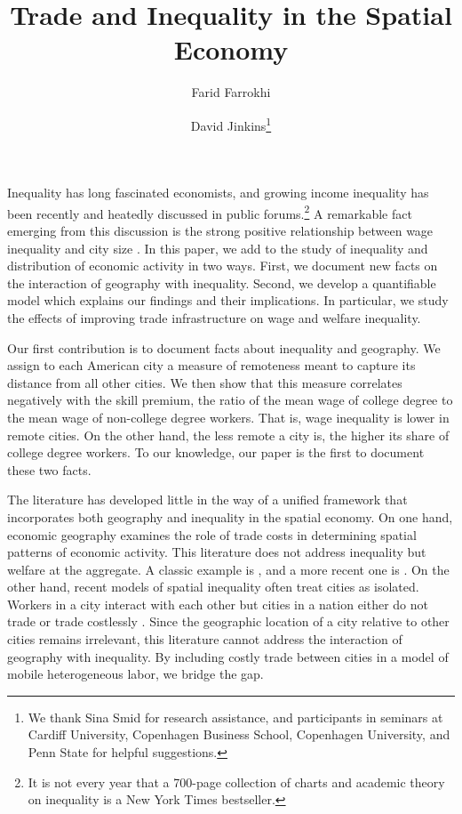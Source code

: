 \documentclass[12 pt]{article}
\title{Trade and Inequality in the Spatial Economy}
\author[1]{Farid Farrokhi}
\author[2]{David Jinkins\thanks{We thank Sina Smid for research assistance, and participants in seminars at Cardiff University, Copenhagen Business School, Copenhagen University, and Penn State for helpful suggestions.}}
\affil[1]{Penn State}
\affil[2]{Copenhagen Business School}
\begin{document}
\maketitle

Inequality has long fascinated economists, and growing income inequality has been recently and heatedly discussed in public forums.\footnote{It is not every year that a 700-page collection of charts and academic theory on inequality is a New York Times bestseller.} A remarkable fact emerging from this discussion is the strong positive relationship between wage inequality and city size \citep{baum2012understanding}.  In this paper, we add to the study of inequality and distribution of economic activity in two ways. First, we document new facts on the interaction of geography with inequality. Second, we develop a quantifiable model which explains our findings and their implications. In particular, we study the effects of improving trade infrastructure on wage and welfare inequality.

Our first contribution is to document facts about inequality and geography.  We assign to each American city a measure of remoteness meant to capture its distance from all other cities.  We then show that this measure correlates negatively with the skill premium, the ratio of the mean wage of college degree to the mean wage of non-college degree workers. That is, wage inequality is lower in remote cities. On the other hand, the less remote a city is, the higher its share of college degree workers. To our knowledge, our paper is the first to document these two facts.

The literature has developed little in the way of a unified framework that incorporates both geography and inequality in the spatial economy. On one hand, economic geography examines the role of trade costs in determining spatial patterns of economic activity. This literature does not address inequality but welfare at the aggregate.  A classic example is \citep{krugman1991increasing}, and a more recent one is \citet{allen2014trade}. On the other hand, recent models of spatial inequality often treat cities as isolated. Workers in a city interact with each other but cities in a nation either do not trade or trade costlessly \citep{davis2014comparative}. Since the geographic location of a city relative to other cities remains irrelevant, this literature cannot address the interaction of geography with inequality. By including costly trade between cities in a model of mobile heterogeneous labor, we bridge the gap.
\end{document}
